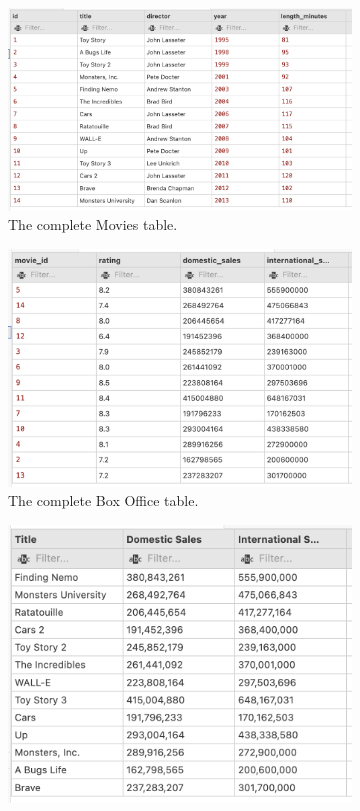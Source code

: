 \captionsetup{justification=centering}
\begin{figure}[H]
    \begin{subfigure}{1\textwidth}
        \centering
        \includegraphics[width=.6\linewidth]{images/output/mov.png}
        \caption*{The complete Movies table.}
        \label{fig:mov}
    \end{subfigure}
    \begin{subfigure}{1\textwidth}
        \centering
        \includegraphics[width=.6\linewidth]{images/output/box.png}
        \caption*{The complete Box Office table.}
        \label{fig:box}
    \end{subfigure}
    \vspace*{10mm}
    \vspace*{10mm}
    \begin{subfigure}{.5\textwidth}
        \centering
        \includegraphics[width=.8\linewidth]{images/output/q5.png}

\end{subfigure}
\end{figure}
